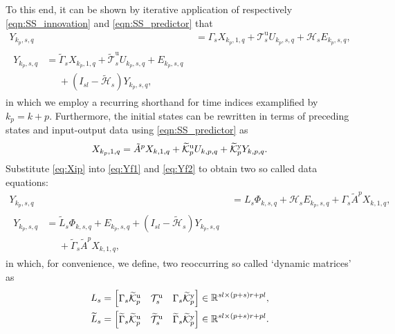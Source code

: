 To this end, it can be shown by iterative application of respectively \eqref{eqn:SS_innovation} and \eqref{eqn:SS_predictor} that%
\begin{align}
    Y_{k_p,s,q} &= \Gamma_s X_{k_p,1,q} + \mathcal{T}_s^\mathrm{u} U_{k_p,s,q} + \mathcal{H}_s E_{k_p,s,q}\label{eq:Yf1},\\
    \begin{split}%
    Y_{k_p,s,q} &= \widetilde{\Gamma}_s X_{k_p,1,q} + \widetilde{\mathcal{T}}_s^\mathrm{u} U_{k_p,s,q} + E_{k_p,s,q}\\
    &\phantom{=}+(I_{sl}-\widetilde{\mathcal{H}}_s)Y_{k_p,s,q},
    \end{split}\label{eq:Yf2}
\end{align}
in which we employ a recurring shorthand for time indices examplified by $k_p=k+p$. Furthermore, the initial states can be rewritten in terms of preceding states and input-output data using \eqref{eqn:SS_predictor} as%
\begin{align}\label{eq:Xip}
    X_{k_p,1,q} = \tilde{A}^p X_{k,1,q} + \widetilde{\mathcal{K}}_{p}^{\mathrm{{u}}} U_{k,p,q} + \widetilde{\mathcal{K}}_{p}^{\mathrm{{y}}} Y_{k,p,q}.
\end{align}
Substitute \eqref{eq:Xip} into \eqref{eq:Yf1} and \eqref{eq:Yf2} %
to obtain two so called data equations:
\begin{align}
    Y_{k_p,s,q} &= L_s \Phi_{k,s,q} + \mathcal{H}_s E_{k_p,s,q} + \Gamma_s \tilde{A}^p X_{k,1,q},\label{eq:DataEq1}\\
    \begin{split}
    Y_{k_p,s,q} &= \widetilde{L}_s \Phi_{k,s,q} + E_{k_p,s,q} + (I_{sl}-\widetilde{\mathcal{H}}_s) Y_{k_p,s,q} \\
    &\phantom{=}+ \widetilde{\Gamma}_s \tilde{A}^p X_{k,1,q},
    \end{split}\label{eq:DataEq2}
\end{align}
in which, for convenience, we define, two reoccurring so called `dynamic matrices' as
\begin{align*}
    L_s &= \begin{bmatrix} \Gamma_s\tKp{u} & \mathcal{T}_s^\mathrm{u} & \Gamma_s\tKp{y} \end{bmatrix}\in\mathbb{R}^{sl\times (p+s)r+pl},\\%
    \widetilde{L}_s &= \begin{bmatrix} \widetilde{\Gamma}_s\tKp{u} & \widetilde{\mathcal{T}}_s^\mathrm{u} & \widetilde{\Gamma}_s\tKp{y} \end{bmatrix}\in\mathbb{R}^{sl\times (p+s)r+pl}.
\end{align*}

